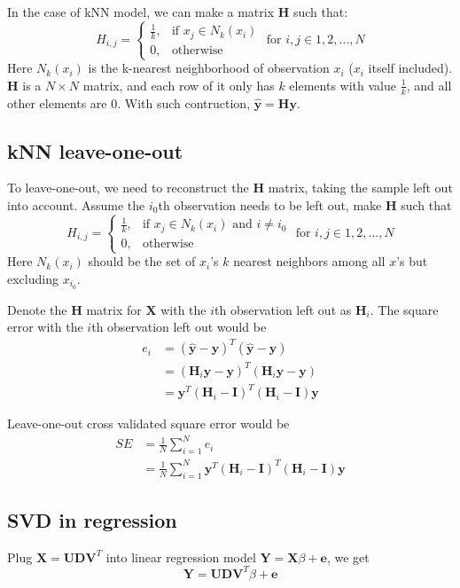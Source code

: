 \documentclass[12pt]{article}
\begin{document}
In the case of kNN model, we can make a matrix $\bm{H}$ such that:
\[
	H_{i,j} = 
	\begin{cases}
		\frac{1}{k}, & \text{if } x_j \in N_k(x_i) \\
		0, & \text{otherwise}
	\end{cases}
	\text{ for } i, j \in 1,2,..., N
\]
Here $N_k(x_i)$ is the k-nearest neighborhood of observation $x_i$ 
($x_i$ itself included).
$\bm{H}$ is a $N\times N$ matrix, and each row of it only has $k$ elements with value $\frac{1}{k}$, and all other elements are 0.
With such contruction, $\hat{\bm{y}}=\bm{H}\bm{y}$.


\subsection{kNN leave-one-out}
To leave-one-out, we need to reconstruct the $\bm{H}$ matrix,
taking the sample left out into account.
Assume the $i_0$th observation needs to be left out, 
make $\bm{H}$ such that
\[
	H_{i,j} = 
	\begin{cases}
		\frac{1}{k}, & \text{if } x_j \in N_k(x_i) \text{ and } i \neq i_0 \\
		0, & \text{otherwise}
	\end{cases}
	\text{ for } i, j \in 1,2,..., N
\]
Here $N_k(x_i)$ should be the set of $x_i$'s $k$ nearest neighbors among all $x$'s but excluding $x_{i_0}$.

Denote the $\bm{H}$ matrix for $\bm{X}$ with the $i$th observation left out as $\bm{H}_i$.
The square error with the $i$th observation left out would be
\begin{align*}
	e_i & = (\hat{\bm{y}}-\bm{y})^T (\hat{\bm{y}}-\bm{y}) \\
	& = (\bm{H}_i \bm{y}-\bm{y})^T (\bm{H}_i \bm{y}-\bm{y}) \\
	& = \bm{y}^T (\bm{H}_i - \bm{I})^T (\bm{H}_i - \bm{I}) \bm{y}
\end{align*}

Leave-one-out cross validated square error would be
\begin{align*}
	SE & = \frac{1}{N} \sum_{i=1}^{N} e_i \\
	& = \frac{1}{N} \sum_{i=1}^{N}\bm{y}^T (\bm{H}_i - \bm{I})^T (\bm{H}_i - \bm{I}) \bm{y}
\end{align*}

\subsection{SVD in regression}
Plug $\bm{X} = \bm{U} \bm{D} \bm{V}^T$ into 
linear regression model $\bm{Y} = \bm{X}\beta + \bm{e} $,
we get \[ \bm{Y} = \bm{U} \bm{D} \bm{V}^T \beta + \bm{e} \]
\end{document}
